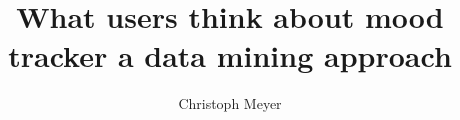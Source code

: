 \documentclass[uulm-release-print]{thesis-uulm}
\author{Christoph Meyer}
\title{What users think about mood tracker \newline a data mining approach}
\begin{document}
\frontmatter %
\begin{nolinenumbers}
\maketitle
\end{nolinenumbers}




\begin{nolinenumbers}
\tableofcontents
\end{nolinenumbers}







%

\cleardoublepage
\clearpairofpagestyles
\declaration
\end{document}

